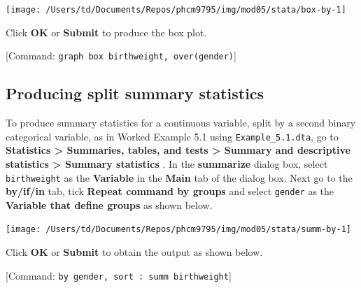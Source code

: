 \documentclass[
]{memoir}
\begin{document}
\texttt{[image: /Users/td/Documents/Repos/phcm9795/img/mod05/stata/box-by-1]}

Click \textbf{OK} or \textbf{Submit} to produce the box plot.

{[}Command: \texttt{graph\ box\ birthweight,\ over(gender)}{]}

\hypertarget{producing-split-summary-statistics}{%
\subsection{Producing split summary statistics}\label{producing-split-summary-statistics}}

To produce summary statistics for a continuous variable, split by a second binary categorical variable, as in Worked Example 5.1 using \texttt{Example\_5.1.dta}, go to \textbf{Statistics \textgreater{} Summaries, tables, and tests \textgreater{} Summary and descriptive statistics \textgreater{} Summary statistics} . In the \textbf{summarize} dialog box, select \texttt{birthweight} as the \textbf{Variable} in the \textbf{Main} tab of the dialog box. Next go to the \textbf{by/if/in} tab, tick \textbf{Repeat command by groups} and select \texttt{gender} as the \textbf{Variable that define groups} as shown below.

\texttt{[image: /Users/td/Documents/Repos/phcm9795/img/mod05/stata/summ-by-1]}

Click \textbf{OK} or \textbf{Submit} to obtain the output as shown below.

{[}Command: \texttt{by\ gender,\ sort\ :\ summ\ birthweight}{]}
\end{document}
